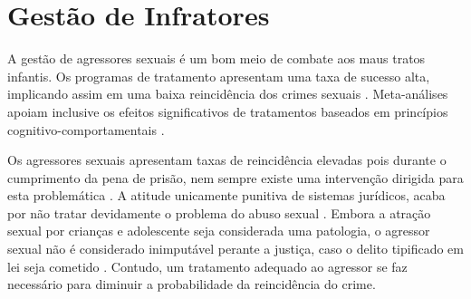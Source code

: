 %
%


\section{Gestão de Infratores}\label{sec:infratores}


A gestão de agressores sexuais é um bom meio de combate aos maus tratos infantis. Os programas de tratamento apresentam uma taxa de sucesso alta, implicando assim em uma baixa reincidência dos crimes sexuais \cite{ribeiro2018programas}. Meta-análises apoiam inclusive os efeitos significativos de tratamentos baseados em princípios cognitivo-comportamentais \cite{mendelson2015parent}.


Os agressores sexuais apresentam taxas de reincidência elevadas pois durante o cumprimento da pena de prisão, nem sempre existe uma intervenção dirigida para esta problemática \cite{ribeiro2018programas, finkelhor2009prevention, maia2014castraccao}. A atitude unicamente punitiva de sistemas jurídicos, acaba por não tratar devidamente o problema do abuso sexual \cite{Camila2019}. Embora a atração sexual por crianças e adolescente seja considerada uma patologia, o agressor sexual não é considerado inimputável perante a justiça, caso o delito tipificado em lei seja cometido \cite{ribeiro2018programas}. Contudo, um tratamento adequado ao agressor se faz necessário para diminuir a probabilidade da reincidência do crime. 


